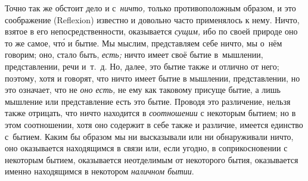 Точно так же обстоит дело и с~{\em ничто,} только противоположным образом,
и это соображение (Reflexion) известно и довольно часто применялось к нему.
Ничто, взятое в его непосредственности, оказывается {\em сущим,} ибо по своей
природе оно то же самое, чт\'{о} и бытие. Мы мыслим, представляем себе ничто,
мы о~нём говорим; оно, стало быть, {\em есть;} ничто имеет своё бытие
в~мышлении, представлении, речи и~т.~д. Но, далее, это бытие также и отлично от
него; поэтому, хотя и говорят, что ничто имеет бытие в мышлении, представлении,
но это означает, что не {\em оно есть,} не ему как таковому присуще бытие, а
лишь мышление или представление есть это бытие. Проводя это различение, нельзя
также отрицать, что ничто находится в {\em соотношении} с некоторым бытием; но
в этом соотношении, хотя оно содержит в себе также и различие, имеется единство
с~бытием. Каким бы образом мы ни высказывали или ни обнаруживали ничто, оно
оказывается находящимся в связи или, если угодно, в соприкосновении с некоторым
бытием, оказывается неотделимым от некоторого бытия, оказывается именно
находящимся в некотором {\em наличном бытии}.

